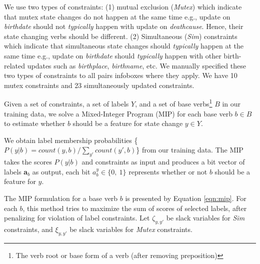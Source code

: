 We use two types of constraints:  (1) mutual exclusion (\textit{Mutex}) which indicate that mutex state changes do not happen at the same time 
e.g., update on \textit{birthdate} should not \textit{typically} happen with update on \textit{deathcause}. Hence,  their state changing verbs should be different. %
(2) Simultaneous (\textit{Sim}) constraints which indicate that simultaneous state changes should \textit{typically} happen at the same time e.g., update on \textit{birthdate} should \textit{typically} happen with other birth-related updates such as \textit{birthplace}, \textit{birthname}, %
etc. 
We manually specified these two types  of  constraints to all pairs infoboxes where they apply. We have 10 mutex constraints and 23 simultaneously updated constraints.

Given a set of constraints, a set of labels $Y$, and a set of base verbs\footnote{The verb root or base form of a verb (after removing preposition)} $B$ in our training data, we solve a Mixed-Integer Program (MIP) for each base verb $b \in B$ to estimate whether $b$ should be a feature for state change $y \in Y$. 

We obtain label membership probabilities \{$P(y | b) = count(y, b) / \sum_{y'} count(y', b) $\} from our training data. The MIP takes the scores $P(y | b)$ and constraints as input and produces a bit vector of labels \textbf{a}$_{b}$ as output, each bit  $a_{b}^{y} \in \{0,\ 1\}$ represents whether or not $b$ should be a feature for $y$.

The MIP formulation for a base verb $b$ is presented by Equation \ref{eqn:mip}. For each $b$, this method tries to maximize the sum of scores of selected labels, after penalizing for violation of label constraints. Let $\zeta_{y, y'}$ be slack variables for \textit{Sim} constraints, and $\xi_{y, y'}$ be slack variables for \textit{Mutex} constraints. 

